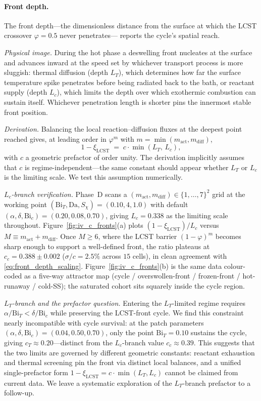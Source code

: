 \documentclass[aps,pre,reprint,superscriptaddress,longbibliography,floatfix]{revtex4-2}
\newcommand{\Da}{\mathrm{Da}}
\newcommand{\Bi}{\mathrm{Bi}}
\begin{document}
\paragraph{Front depth.}
The front depth---the dimensionless distance from the surface at
which the LCST crossover $\varphi\!=\!0.5$ never penetrates---
reports the cycle's spatial reach.

\textit{Physical image.}  During the hot phase a deswelling front
nucleates at the surface and advances inward at the speed set by
whichever transport process is more sluggish: thermal diffusion
(depth $L_T$), which determines how far the surface temperature
spike penetrates before being radiated back to the bath, or
reactant supply (depth $L_c$), which limits the depth over which
exothermic combustion can sustain itself. Whichever penetration
length is shorter pins the innermost stable front position.

\textit{Derivation.}  Balancing the local reaction--diffusion fluxes
at the deepest point reached gives, at leading order in
$\varphi^m$ with $m\!=\!\min(m_\mathrm{act},m_\mathrm{diff})$,
\begin{equation}
  1-\xi_\mathrm{LCST} \;=\; c \cdot \min(L_T,\,L_c),
  \label{eq:front_depth_scaling}
\end{equation}
with $c$ a geometric prefactor of order unity. The derivation
implicitly assumes that $c$ is regime-independent---the same
constant should appear whether $L_T$ or $L_c$ is the limiting
scale. We test this assumption numerically.

\textit{$L_c$-branch verification.}  Phase~D scans a
$(m_\mathrm{act},m_\mathrm{diff})\!\in\!\{1,\ldots,7\}^2$ grid at
the working point $(\Bi_T,\Da,S_\chi)\!=\!(0.10,4,1.0)$ with default
$(\alpha,\delta,\Bi_c)\!=\!(0.20,0.08,0.70)$, giving
$L_c\!=\!0.338$ as the limiting scale throughout.
Figure~\ref{fig:iv_c_fronts}(a) plots
$(1\!-\!\xi_\mathrm{LCST})/L_c$ versus
$M\!\equiv\!m_\mathrm{act}+m_\mathrm{diff}$. Once $M\!\geq\!6$,
where the LCST barrier $(1\!-\!\varphi)^m$ becomes sharp enough to
support a well-defined front, the ratio plateaus at
$c_c\!=\!0.388\!\pm\!0.002$
($\sigma/c\!=\!2.5\%$ across $15$ cells), in clean agreement with
\eqref{eq:front_depth_scaling}.
Figure~\ref{fig:iv_c_fronts}(b) is the same data colour-coded as a
five-way attractor map (cycle / overswollen-front / frozen-front /
hot-runaway / cold-SS); the saturated cohort sits squarely inside
the cycle region.

\textit{$L_T$-branch and the prefactor question.}  Entering the
$L_T$-limited regime requires $\alpha/\Bi_T\!<\!\delta/\Bi_c$ while
preserving the LCST-front cycle. We find this constraint nearly
incompatible with cycle survival: at the patch parameters
$(\alpha,\delta,\Bi_c)\!=\!(0.04,0.50,0.70)$, only the point
$\Bi_T\!=\!0.10$ sustains the cycle, giving
$c_T\!\approx\!0.20$---distinct from the $L_c$-branch value
$c_c\!\approx\!0.39$. This suggests that the two limits are
governed by different geometric constants: reactant exhaustion and
thermal screening pin the front via distinct local balances, and a
unified single-prefactor form
$1\!-\!\xi_\mathrm{LCST}\!=\!c\!\cdot\!\min(L_T,L_c)$ cannot be
claimed from current data. We leave a systematic exploration of
the $L_T$-branch prefactor to a follow-up.
\end{document}
